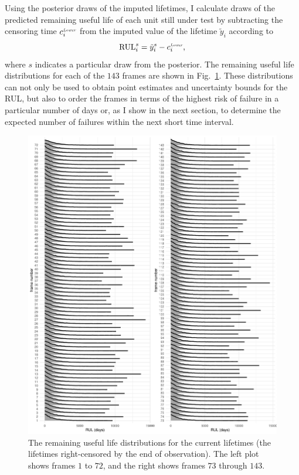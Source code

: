 Using the posterior draws of the imputed lifetimes, I calculate draws of the predicted remaining useful life of each unit still under test by subtracting the censoring time $c^{\textit{\tiny{Lower}}}_i$ from the imputed value of the lifetime $\tilde{y}_{i}$ according to
\begin{equation} \label{eq:idler-rul}
  \hbox{RUL}^s_i  = \tilde{y}_{i}^s - c^{\textit{\tiny{Lower}}}_i,
\end{equation}
where $s$ indicates a particular draw from the posterior. The remaining useful life distributions for each of the $143$ frames are shown in Fig.~\ref{fig:idler-FTs}. These distributions can not only be used to obtain point estimates and uncertainty bounds for the RUL, but also to order the frames in terms of the highest risk of failure in a particular number of days or, as I show in the next section, to determine the expected number of failures within the next short time interval.

\begin{figure}[t]
  \centering
  \includegraphics[width=1\textwidth]{./figures/ch-3/posterior-FTs.pdf}
  \caption{The remaining useful life distributions for the current lifetimes (the lifetimes right-censored by the end of observation). The left plot shows frames $1$ to $72$, and the right shows frames $73$ through $143$.}
  \label{fig:idler-FTs}
\end{figure}

